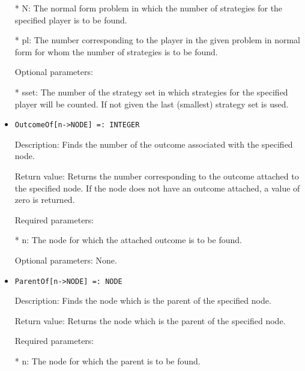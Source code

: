 \begin{itemize}
\bd
\item
[* N:] The normal form problem in which the number of strategies for
the specified player is to be found.
\item
[* pl:] The number corresponding to the player in the given problem 
in normal form for whom the number of strategies is to be
found.
\ed

\item
[Optional parameters:]\hfil\null
	
\bd
\item  
[* sset:] The number of the strategy set in which strategies for the
specified player will be counted.  If not given the last (smallest) 
strategy set is used.

\ed
\ed

\item

\begin{verbatim}
OutcomeOf[n->NODE] =: INTEGER
\end{verbatim}

\bd

\item
[Description:] Finds the number of the outcome associated with the 
specified node.
\item
[Return value:] Returns the number corresponding to the outcome attached
to the specified node.  If the node does not have an outcome attached,
a value of zero is returned.
\item
[Required parameters:]\hfil\null
	
\bd
\item
[* n:] The node for which the attached outcome is to be found.
\ed

\item
[Optional parameters:] None.
\ed

\item

\begin{verbatim}
ParentOf[n->NODE] =: NODE
\end{verbatim}

\bd
\item
[Description:] Finds the node which is the parent of the specified node.
\item
[Return value:] Returns the node which is the parent of the specified
node.
\item
[Required parameters:]\hfil\null
	
\bd
\item
[* n:] The node for which the parent is to be found.
\ed


\end{itemize}

